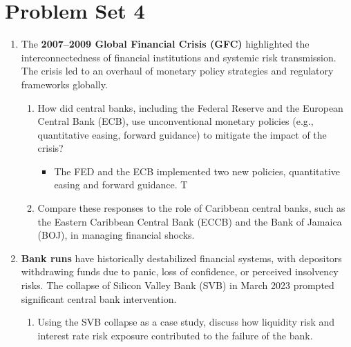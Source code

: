 \newpage

\section{Problem Set 4}

\begin{enumerate}

    \item The \textbf{2007–2009 Global Financial Crisis (GFC)} highlighted the interconnectedness
    of financial institutions and systemic risk transmission. The crisis led to an
    overhaul of monetary policy strategies and regulatory frameworks globally.
    
    \begin{enumerate}
        \item How did central banks, including the Federal Reserve and the European Central
        Bank (ECB), use unconventional monetary policies (e.g., quantitative easing,
        forward guidance) to mitigate the impact of the crisis?

        \begin{itemize}
            \item The FED and the ECB implemented two new policies, quantitative easing and forward guidance. T
        \end{itemize}

        
        \item Compare these responses to the role of Caribbean central banks, such as the
        Eastern Caribbean Central Bank (ECCB) and the Bank of Jamaica (BOJ), in
        managing financial shocks.
    \end{enumerate}

    \item \textbf{Bank runs} have historically destabilized financial systems, with depositors
    withdrawing funds due to panic, loss of confidence, or perceived insolvency risks.
    The collapse of Silicon Valley Bank (SVB) in March 2023 prompted significant
    central bank intervention.
    
    \begin{enumerate}
        \item Using the SVB collapse as a case study, discuss how liquidity risk and interest
        rate risk exposure contributed to the failure of the bank.


\end{enumerate}
\end{enumerate}
